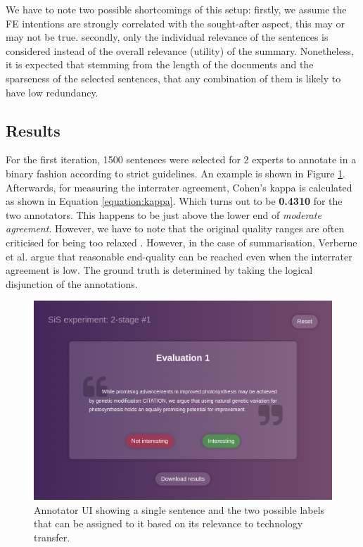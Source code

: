 We have to note two possible shortcomings of this setup: firstly, we assume the FE intentions are strongly correlated with the sought-after aspect, this may or may not be true. secondly, only the individual relevance of the sentences is considered instead of the overall relevance (utility) of the summary. Nonetheless, it is expected that stemming from the length of the documents and the sparseness of the selected sentences, that any combination of them is likely to have low redundancy.

\subsection{Results}

For the first iteration, 1500 sentences were selected for 2 experts to annotate in a binary fashion according to strict guidelines. An example is shown in Figure \ref{fig:annotator}. Afterwards, for measuring the interrater agreement, Cohen's kappa \cite{cohen1960coefficient} is calculated as shown in Equation \ref{equation:kappa}. Which turns out to be \textbf{0.4310} for the two annotators. This happens to be just above the lower end of \textit{moderate agreement}. However, we have to note that the original quality ranges are often criticised for being too relaxed \cite{mchugh2012interrater}. However, in the case of summarisation, Verberne et al. \cite{verberne2018creating} argue that reasonable end-quality can be reached even when the interrater agreement is low. The ground truth is determined by taking the logical disjunction of the annotations.

\begin{figure}
    \centering
    \includegraphics[width=0.75\linewidth]{figures/annotator.png}
    \caption{Annotator UI showing a single sentence and the two possible labels that can be assigned to it based on its relevance to technology transfer.}
    \label{fig:annotator}
\end{figure}

